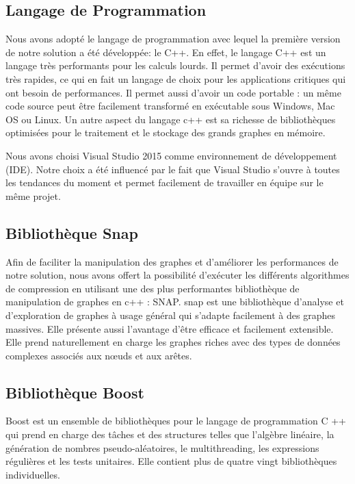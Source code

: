 		\subsection{Langage de Programmation}
		Nous avons adopté le langage de programmation avec lequel la    première version de notre solution a été développée: le C++. En effet, le langage C++ est un langage très performants pour les calculs lourds. Il permet d'avoir des exécutions très rapides, ce qui en fait un langage de choix pour les applications critiques qui ont besoin de performances. Il permet aussi d'avoir un code portable : un même code source peut être facilement transformé en exécutable sous Windows, Mac OS ou Linux. Un autre aspect du langage c++ est sa richesse de bibliothèques optimisées pour le traitement et le stockage des grands graphes en mémoire. 
		
		Nous avons choisi Visual Studio 2015 comme environnement de développement (IDE). Notre choix a été influencé par le fait que Visual Studio s'ouvre à toutes les tendances du moment et permet facilement de travailler en équipe sur le même projet.
		
		\subsection{Bibliothèque Snap}
		
		Afin de faciliter la manipulation des graphes et d'améliorer les performances de notre solution, nous avons offert la possibilité d'exécuter les différents algorithmes de compression en utilisant une des plus performantes bibliothèque de manipulation de graphes en c++ : SNAP.
		\gls{snap} est une bibliothèque d'analyse et d'exploration de graphes à usage général qui s'adapte facilement à des graphes massives. Elle présente aussi l'avantage d'être  efficace et facilement extensible. Elle prend naturellement en charge les graphes riches avec des types de données complexes associés aux nœuds et aux arêtes. 
		
		\subsection{Bibliothèque Boost}
		

Boost est un ensemble de bibliothèques pour le langage de programmation C ++ qui prend en charge des tâches et des structures telles que l'algèbre linéaire, la génération de nombres pseudo-aléatoires, le multithreading, les expressions régulières et les tests unitaires. Elle contient plus de quatre vingt bibliothèques individuelles.

